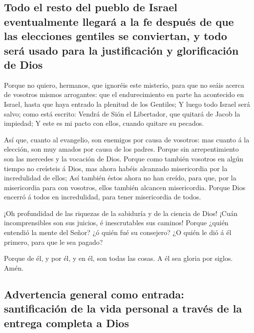 \hypertarget{todo-el-resto-del-pueblo-de-israel-eventualmente-llegaruxe1-a-la-fe-despuuxe9s-de-que-las-elecciones-gentiles-se-conviertan-y-todo-seruxe1-usado-para-la-justificaciuxf3n-y-glorificaciuxf3n-de-dios}{%
\subsection{Todo el resto del pueblo de Israel eventualmente llegará a
la fe después de que las elecciones gentiles se conviertan, y todo será
usado para la justificación y glorificación de
Dios}\label{todo-el-resto-del-pueblo-de-israel-eventualmente-llegaruxe1-a-la-fe-despuuxe9s-de-que-las-elecciones-gentiles-se-conviertan-y-todo-seruxe1-usado-para-la-justificaciuxf3n-y-glorificaciuxf3n-de-dios}}

 Porque no quiero, hermanos, que ignoréis este misterio,
para que no seáis acerca de vosotros mismos arrogantes: que el
endurecimiento en parte ha acontecido en Israel, hasta que haya entrado
la plenitud de los Gentiles;  Y luego todo Israel será
salvo; como está escrito: Vendrá de Sión el Libertador, que quitará de
Jacob la impiedad;  Y este es mi pacto con ellos, cuando
quitare su pecados.

 Así que, cuanto al evangelio, son enemigos por causa de
vosotros: mas cuanto á la elección, son muy amados por causa de los
padres.  Porque sin arrepentimiento son las mercedes y la
vocación de Dios.  Porque como también vosotros en algún
tiempo no creísteis á Dios, mas ahora habéis alcanzado misericordia por
la incredulidad de ellos;  Así también éstos ahora no han
creído, para que, por la misericordia para con vosotros, ellos también
alcancen misericordia.  Porque Dios encerró á todos en
incredulidad, para tener misericordia de todos.

 ¡Oh profundidad de las riquezas de la sabiduría y de la
ciencia de Dios! ¡Cuán incomprensibles son sus juicios, é inescrutables
sus caminos!  Porque ¿quién entendió la mente del Señor?
¿ó quién fué su consejero?  ¿O quién le dió á él primero,
para que le sea pagado?

 Porque de él, y por él, y en él, son todas las cosas. A
él sea gloria por siglos. Amén.

\hypertarget{advertencia-general-como-entrada-santificaciuxf3n-de-la-vida-personal-a-travuxe9s-de-la-entrega-completa-a-dios}{%
\subsection{Advertencia general como entrada: santificación de la vida
personal a través de la entrega completa a
Dios}\label{advertencia-general-como-entrada-santificaciuxf3n-de-la-vida-personal-a-travuxe9s-de-la-entrega-completa-a-dios}}

